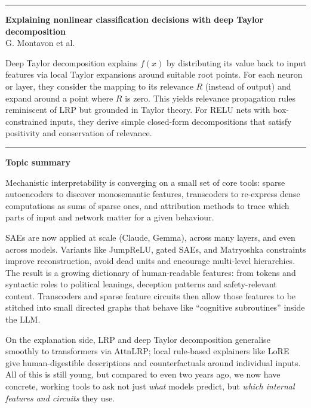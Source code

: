 \documentclass[a5paper]{article}
\def\subsection#1{{\par\bigskip\goodbreak\large\bfseries #1\par}}
\begin{document}
\begin{center}\rule{0.5\linewidth}{0.5pt}\end{center}

\textbf{Explaining nonlinear classification decisions with deep Taylor
decomposition}\\
G. Montavon et al.

Deep Taylor decomposition explains $f(x)$ by distributing its value back
to input features via local Taylor expansions around suitable root
points. For each neuron or layer, they consider the mapping to its
relevance $R$ (instead of output) and expand around a point where $R$ is
zero. This yields relevance propagation rules reminiscent of LRP but
grounded in Taylor theory. For RELU nets with box-constrained inputs,
they derive simple closed-form decompositions that satisfy positivity
and conservation of relevance.

\begin{center}\rule{0.5\linewidth}{0.5pt}\end{center}

\subsection{Topic summary}\label{topic-summary-9}

Mechanistic interpretability is converging on a small set of core tools:
sparse autoencoders to discover monosemantic features, transcoders to
re-express dense computations as sums of sparse ones, and attribution
methods to trace which parts of input and network matter for a given
behaviour.

SAEs are now applied at scale (Claude, Gemma), across many layers, and
even across models. Variants like JumpReLU, gated SAEs, and Matryoshka
constraints improve reconstruction, avoid dead units and encourage
multi-level hierarchies. The result is a growing dictionary of
human-readable features: from tokens and syntactic roles to political
leanings, deception patterns and safety-relevant content. Transcoders
and sparse feature circuits then allow those features to be stitched
into small directed graphs that behave like ``cognitive subroutines''
inside the LLM.

On the explanation side, LRP and deep Taylor decomposition generalise
smoothly to transformers via AttnLRP; local rule-based explainers like
LoRE give human-digestible descriptions and counterfactuals around
individual inputs. All of this is still young, but compared to even two
years ago, we now have concrete, working tools to ask not just
\emph{what} models predict, but \emph{which internal features and
circuits} they use.
\end{document}
